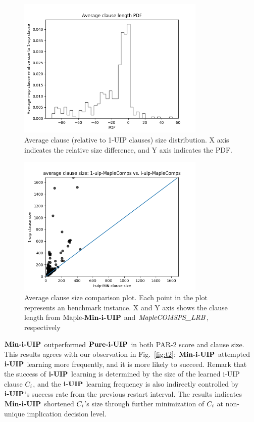 \begin{figure}
    \centering
    \includegraphics[width=0.8\textwidth,natwidth=610,natheight=642]{clause_length_PDF.png}
    \caption{Average clause (relative to 1-UIP clauses) size distribution. X axis indicates the relative size difference, and Y axis indicates the PDF.}
     \label{fig:len_pdf}
\end{figure}
\begin{figure} \label{fig:len_compare}
    \centering
    \includegraphics[width=0.8\textwidth,natwidth=610,natheight=642]{i-uip-sizes-compare.png}
    \caption{Average clause size comparison plot. Each point in the plot represents an benchmark instance. X and Y axis shows the clause length from $\text{Maple-\textbf{Min-i-UIP}}$ and $\textit{MapleCOMSPS\_LRB}$, respectively  }
    \label{fig:len_compare}
\end{figure}


$\textbf{Min-i-UIP}$ outperformed $\textbf{Pure-i-UIP}$ in both PAR-2 score and clause size.  This results agrees with our observation in Fig.~\ref{fig:t2}: $\textbf{Min-i-UIP}$ attempted $\textbf{i-UIP}$ learning more frequently, and it is more likely to succeed. Remark that the success of $\textbf{i-UIP}$ learning is determined by the size of the learned i-UIP clause $C_{i}$, and the $\textbf{i-UIP}$ learning frequency is also indirectly controlled by $\textbf{i-UIP}$'s success rate from the previous restart interval. The results indicates  $\textbf{Min-i-UIP}$ shortened $C_{i}$'s size through further minimization of $C_{i}$ at non-unique implication decision level.



